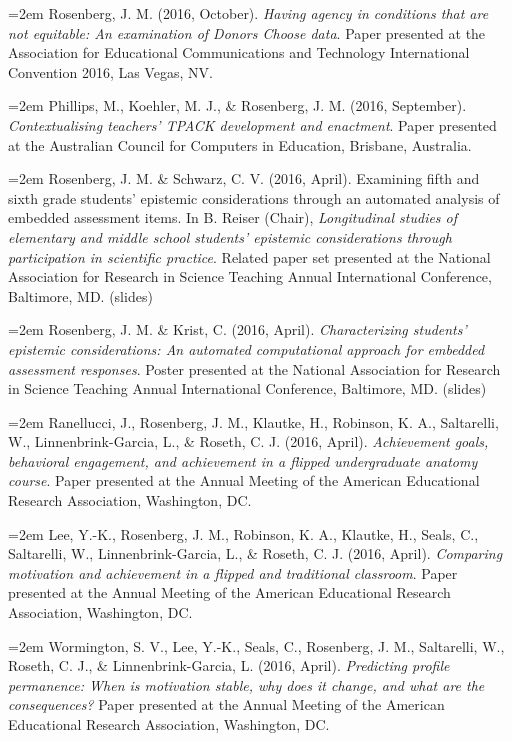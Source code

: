 \documentclass[
  14,
]{article}
\begin{document}
\hangindent=2em Rosenberg, J. M. (2016, October). \emph{Having agency in
conditions that are not equitable: An examination of Donors Choose
data}. Paper presented at the Association for Educational Communications
and Technology International Convention 2016, Las Vegas, NV.

\hangindent=2em Phillips, M., Koehler, M. J., \& Rosenberg, J. M. (2016,
September). \emph{Contextualising teachers' TPACK development and
enactment}. Paper presented at the Australian Council for Computers in
Education, Brisbane, Australia.

\hangindent=2em Rosenberg, J. M. \& Schwarz, C. V. (2016, April).
Examining fifth and sixth grade students' epistemic considerations
through an automated analysis of embedded assessment items. In B. Reiser
(Chair), \emph{Longitudinal studies of elementary and middle school
students' epistemic considerations through participation in scientific
practice}. Related paper set presented at the National Association for
Research in Science Teaching Annual International Conference, Baltimore,
MD. (slides)

\hangindent=2em Rosenberg, J. M. \& Krist, C. (2016, April).
\emph{Characterizing students' epistemic considerations: An automated
computational approach for embedded assessment responses}. Poster
presented at the National Association for Research in Science Teaching
Annual International Conference, Baltimore, MD. (slides)

\hangindent=2em Ranellucci, J., Rosenberg, J. M., Klautke, H., Robinson,
K. A., Saltarelli, W., Linnenbrink-Garcia, L., \& Roseth, C. J. (2016,
April). \emph{Achievement goals, behavioral engagement, and achievement
in a flipped undergraduate anatomy course}. Paper presented at the
Annual Meeting of the American Educational Research Association,
Washington, DC.

\hangindent=2em Lee, Y.-K., Rosenberg, J. M., Robinson, K. A., Klautke,
H., Seals, C., Saltarelli, W., Linnenbrink-Garcia, L., \& Roseth, C. J.
(2016, April). \emph{Comparing motivation and achievement in a flipped
and traditional classroom}. Paper presented at the Annual Meeting of the
American Educational Research Association, Washington, DC.

\hangindent=2em Wormington, S. V., Lee, Y.-K., Seals, C., Rosenberg, J.
M., Saltarelli, W., Roseth, C. J., \& Linnenbrink-Garcia, L. (2016,
April). \emph{Predicting profile permanence: When is motivation stable,
why does it change, and what are the consequences?} Paper presented at
the Annual Meeting of the American Educational Research Association,
Washington, DC.
\end{document}

